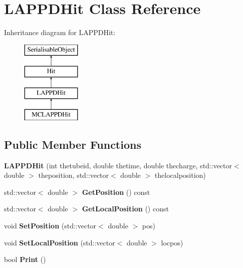 \hypertarget{classLAPPDHit}{\section{L\-A\-P\-P\-D\-Hit Class Reference}
\label{classLAPPDHit}
}
Inheritance diagram for L\-A\-P\-P\-D\-Hit\-:\begin{figure}[H]
\begin{center}
\leavevmode
\includegraphics[height=4.000000cm]{classLAPPDHit}
\end{center}
\end{figure}
\subsection*{Public Member Functions}
\begin{DoxyCompactItemize}
\item 
\hypertarget{classLAPPDHit_afe5f8ccfdc8ea9c3cbf1ceb9c441e71d}{{\bfseries L\-A\-P\-P\-D\-Hit} (int thetubeid, double thetime, double thecharge, std\-::vector$<$ double $>$ theposition, std\-::vector$<$ double $>$ thelocalposition)}\label{classLAPPDHit_afe5f8ccfdc8ea9c3cbf1ceb9c441e71d}

\item 
\hypertarget{classLAPPDHit_ae1828d2ea7a97bc4fea858aaf94cedb4}{std\-::vector$<$ double $>$ {\bfseries Get\-Position} () const }\label{classLAPPDHit_ae1828d2ea7a97bc4fea858aaf94cedb4}

\item 
\hypertarget{classLAPPDHit_a9d1c4249ca261677004dbb0ea65effb1}{std\-::vector$<$ double $>$ {\bfseries Get\-Local\-Position} () const }\label{classLAPPDHit_a9d1c4249ca261677004dbb0ea65effb1}

\item 
\hypertarget{classLAPPDHit_acddccb2ec31fd46be236b32ede3a783b}{void {\bfseries Set\-Position} (std\-::vector$<$ double $>$ pos)}\label{classLAPPDHit_acddccb2ec31fd46be236b32ede3a783b}

\item 
\hypertarget{classLAPPDHit_a21e01043d24da9974933bbcfa2d23d3c}{void {\bfseries Set\-Local\-Position} (std\-::vector$<$ double $>$ locpos)}\label{classLAPPDHit_a21e01043d24da9974933bbcfa2d23d3c}

\item 
\hypertarget{classLAPPDHit_af993f8cd1441e7a37e8e1ca0e6890654}{bool {\bfseries Print} ()}\label{classLAPPDHit_af993f8cd1441e7a37e8e1ca0e6890654}

\end{DoxyCompactItemize}
